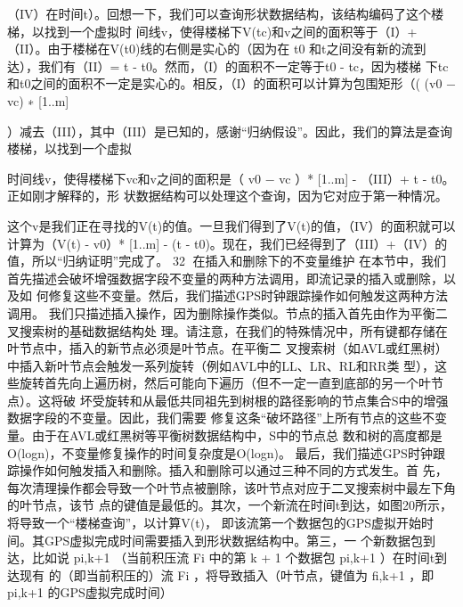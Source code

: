 （IV）在时间t）。回想一下，我们可以查询形状数据结构，该结构编码了这个楼梯，以找到一个虚拟时
间线v，使得楼梯下V(tc)和v之间的面积等于（I）+（II）。由于楼梯在V(t0)线的右侧是实心的（因为在
 t0 和t之间没有新的流到达），我们有（II）= t - t0。然而，（I）的面积不一定等于t0 - tc，因为楼梯
下tc和t0之间的面积不一定是实心的。相反，（I）的面积可以计算为包围矩形（( (v0 − vc) ∗ [1..m]
  ​




）减去（III），其中（III）是已知的，感谢“归纳假设”。因此，我们的算法是查询楼梯，以找到一个虚拟
                                                                 ​




时间线v，使得楼梯下vc和v之间的面积是（ v0 − vc ）* [1..m] - （III）+ t - t0。正如刚才解释的，形
状数据结构可以处理这个查询，因为它对应于第一种情况。
                                ​




这个v是我们正在寻找的V(t)的值。一旦我们得到了V(t)的值，（IV）的面积就可以计算为（V(t) - v0）*
[1..m] - (t - t0)。现在，我们已经得到了（III）+（IV）的值，所以“归纳证明”完成了。
                                                                         32
在插入和删除下的不变量维护
在本节中，我们首先描述会破坏增强数据字段不变量的两种方法调用，即流记录的插入或删除，以及如
何修复这些不变量。然后，我们描述GPS时钟跟踪操作如何触发这两种方法调用。
我们只描述插入操作，因为删除操作类似。节点的插入首先由作为平衡二叉搜索树的基础数据结构处
理。请注意，在我们的特殊情况中，所有键都存储在叶节点中，插入的新节点必须是叶节点。在平衡二
叉搜索树（如AVL或红黑树）中插入新叶节点会触发一系列旋转（例如AVL中的LL、LR、RL和RR类
型），这些旋转首先向上遍历树，然后可能向下遍历（但不一定一直到底部的另一个叶节点）。这将破
坏受旋转和从最低共同祖先到树根的路径影响的节点集合S中的增强数据字段的不变量。因此，我们需要
修复这条“破坏路径”上所有节点的这些不变量。由于在AVL或红黑树等平衡树数据结构中，S中的节点总
数和树的高度都是O(logn)，不变量修复操作的时间复杂度是O(logn)。
最后，我们描述GPS时钟跟踪操作如何触发插入和删除。插入和删除可以通过三种不同的方式发生。首
先，每次清理操作都会导致一个叶节点被删除，该叶节点对应于二叉搜索树中最左下角的叶节点，该节
点的键值是最低的。其次，一个新流在时间t到达，如图20所示，将导致一个“楼梯查询”，以计算V(t)，
即该流第一个数据包的GPS虚拟开始时间。其GPS虚拟完成时间需要插入到形状数据结构中。第三，一
个新数据包到达，比如说 pi,k+1 （当前积压流 Fi 中的第 k + 1 个数据包 pi,k+1 ）在时间t到达现有
的（即当前积压的）流 Fi ，将导致插入（叶节点，键值为 fi,k+1 ，即 pi,k+1 的GPS虚拟完成时间）
                       ​     ​                       ​




